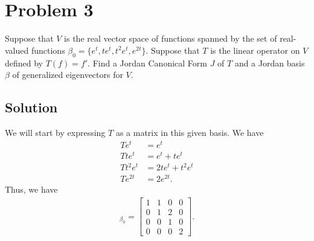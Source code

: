 \documentclass[10pt,a4paper]{article}
\theoremstyle{definition}
\begin{document}
\section*{Problem 3}
Suppose that $V$ is the real vector space of functions spanned by the set of real-valued functions $\beta_0 = \{e^t, te^t, t^2e^t, e^{2t}\}$. Suppose that $T$ is the linear operator on $V$ defined by $T(f) = f'$. Find a Jordan Canonical Form $J$ of $T$ and a Jordan basis $\beta$ of generalized eigenvectors for $V$.

\subsection*{Solution}
We will start by expressing $T$ as a matrix in this given basis. We have
\begin{align*}
Te^t &= e^t\\
Tte^t &= e^t + te^t\\
Tt^2e^t &= 2te^t + t^2 e^t\\
Te^{2t} &= 2 e^{2t}.
\end{align*}
Thus, we have
\begin{align*}
[T]_{\beta_0} = \begin{bmatrix}
1 &1 &0 &0\\
0 &1 &2 &0\\
0 &0 &1 &0\\
0 &0 &0 &2
\end{bmatrix}.
\end{align*}
\end{document}
